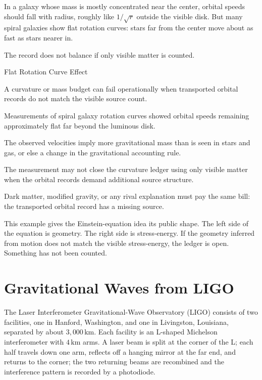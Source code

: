 In a galaxy whose mass is mostly concentrated near the center, orbital speeds
should fall with radius, roughly like $1/\sqrt r$ outside the visible disk. But
many spiral galaxies show flat rotation curves: stars far from the center move
about as fast as stars nearer in.

The record does not balance if only visible matter is counted.

\begin{phenom}{Flat Rotation Curve Effect}
\label{ph:flat-rotation-curve-effect}

\PhStatement A curvature or mass budget can fail operationally when transported
orbital records do not match the visible source count.

\PhOrigin Measurements of spiral galaxy rotation curves showed orbital speeds
remaining approximately flat far beyond the luminous disk.

\PhObservation The observed velocities imply more gravitational mass than is
seen in stars and gas, or else a change in the gravitational accounting rule.

\PhConstraint The measurement may not close the curvature ledger using only
visible matter when the orbital records demand additional source structure.

\PhConsequence Dark matter, modified gravity, or any rival explanation must pay
the same bill: the transported orbital record has a missing source.

\end{phenom}

This example gives the Einstein-equation idea its public shape. The left side
of the equation is geometry. The right side is stress-energy. If the geometry
inferred from motion does not match the visible stress-energy, the ledger is
open. Something has not been counted.

\section{Gravitational Waves from LIGO}
\label{se:gravitational-waves-from-ligo}

The Laser Interferometer Gravitational-Wave Observatory (LIGO) consists of
two facilities, one in Hanford, Washington, and one in Livingston, Louisiana,
separated by about $3{,}000\,\mathrm{km}$. Each facility is an L-shaped
Michelson interferometer with $4\,\mathrm{km}$ arms. A laser beam is split at
the corner of the L; each half travels down one arm, reflects off a hanging
mirror at the far end, and returns to the corner; the two returning beams
are recombined and the interference pattern is recorded by a photodiode.

